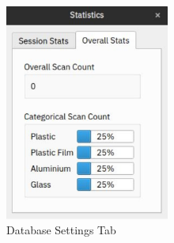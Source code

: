 \documentclass[conference]{IEEEtran}
\begin{document}
\begin{figure}[h]
    \centering
    \includegraphics[width=0.48\textwidth]{images/statistics_overall.eps}
    \caption{Database Settings Tab}
\end{figure}~\\
\end{document}
